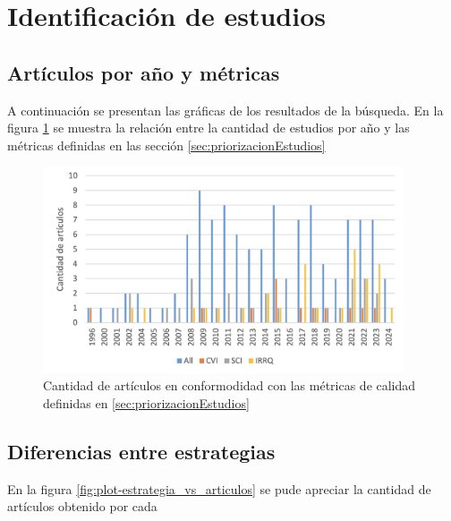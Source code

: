 \section{Identificación de estudios}

\subsection{Artículos por año y métricas}
\noindent
A continuación se presentan las gráficas de los resultados de la búsqueda. En la figura \ref{fig:plot-anios-vs-indices-calidad} se muestra la relación entre la cantidad de estudios por año y las métricas definidas en las sección \ref{sec:priorizacionEstudios}

\begin{figure}[H]
	\begin{center}
		\includegraphics[width=0.95\textwidth]{tablas-images/sms/plot-freq-indices.png}
	\end{center}
	\caption{Cantidad de artículos en conformodidad con las métricas de calidad definidas en \ref{sec:priorizacionEstudios}}
	\label{fig:plot-anios-vs-indices-calidad}
\end{figure}



\subsection{Diferencias entre estrategias}

En la figura \ref{fig:plot-estrategia_vs_articulos} se pude apreciar la cantidad de artículos obtenido por cada


